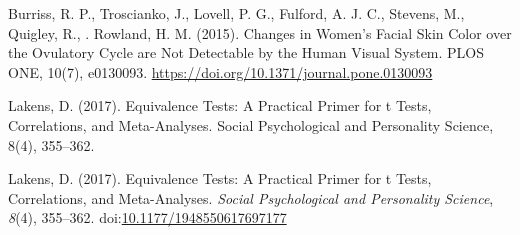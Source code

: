 \documentclass[english,man]{apa6}
\theoremstyle{definition}
\theoremstyle{definition}
\theoremstyle{definition}
\theoremstyle{remark}
\begin{document}
Burriss, R. P., Troscianko, J., Lovell, P. G., Fulford, A. J. C.,
Stevens, M., Quigley, R., . Rowland, H. M. (2015). Changes in Women's
Facial Skin Color over the Ovulatory Cycle are Not Detectable by the
Human Visual System. PLOS ONE, 10(7), e0130093.
\url{https://doi.org/10.1371/journal.pone.0130093}

Lakens, D. (2017). Equivalence Tests: A Practical Primer for t Tests,
Correlations, and Meta-Analyses. Social Psychological and Personality
Science, 8(4), 355--362.

\hypertarget{refs}{}
\hypertarget{ref-lakens_equivalence_2017}{}
Lakens, D. (2017). Equivalence Tests: A Practical Primer for t Tests,
Correlations, and Meta-Analyses. \emph{Social Psychological and
Personality Science}, \emph{8}(4), 355--362.
doi:\href{https://doi.org/10.1177/1948550617697177}{10.1177/1948550617697177}
\end{document}
